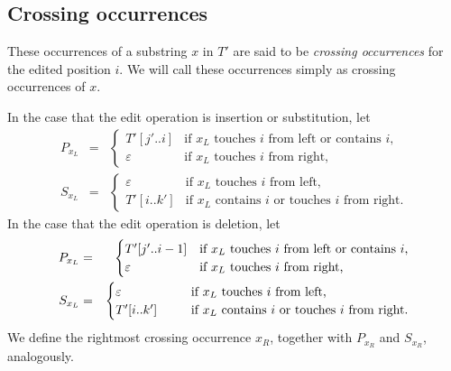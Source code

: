 \subsection{Crossing occurrences}

\begin{definition}%
  These occurrences of a substring $x$ in $T'$
  are said to be \emph{crossing occurrences} for
  the edited position $i$.
  We will call these occurrences simply as crossing occurrences of $x$.
  \end{definition}

%

In the case that the edit operation is insertion or substitution, let
\begin{eqnarray*}
P_{x_L} & = & 
    \begin{cases}
     T'[j'..i] & \mbox{if $x_L$ touches $i$ from left or contains $i$,}\\
     \varepsilon & \mbox{if $x_L$ touches $i$ from right,}
    \end{cases}\\
S_{x_L} & = &
    \begin{cases}
     \varepsilon & \mbox{if $x_L$ touches $i$ from left,}  \\
     T'[i..k'] & \mbox{if $x_L$ contains $i$ or touches $i$ from right.}
    \end{cases}
\end{eqnarray*}
In the case that the edit operation is deletion, let
\begin{eqnarray*}
P_{x_L} & = &
    \begin{cases}
     T'[j'..i-1] & \mbox{if $x_L$ touches $i$ from left or contains $i$,}\\
     \varepsilon & \mbox{if $x_L$ touches $i$ from right,}
    \end{cases}\\
S_{x_L} & = &
    \begin{cases}
     \varepsilon & \hspace*{6mm} \mbox{if $x_L$ touches $i$ from left,}  \\
     T'[i..k'] & \hspace*{6mm} \mbox{if $x_L$ contains $i$ or touches $i$ from right.}
    \end{cases}
\end{eqnarray*}
We define the rightmost crossing occurrence $x_R$, together with $P_{x_R}$ and $S_{x_R}$, analogously.

